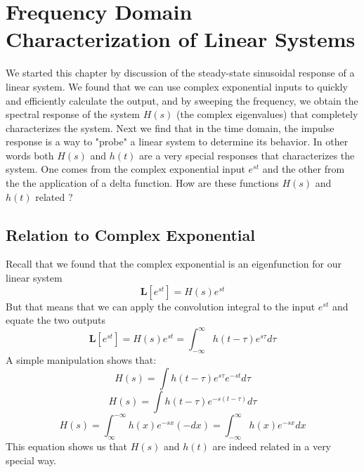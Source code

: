 \section{Frequency Domain Characterization of Linear Systems}
We started this chapter by discussion of the steady-state sinusoidal response of a linear system.  We found that we can use complex exponential inputs to quickly and efficiently calculate the output, and by sweeping the frequency, we obtain the spectral response of the system $H(s)$ (the complex eigenvalues) that completely characterizes the system.   Next we find that in the time domain, the impulse response is a way to "probe" a linear system to determine its behavior.  In other words both $H(s)$ and $h(t)$ are a very special responses that characterizes the system.  One comes from the complex exponential input $e^{st}$ and the other from the the application of a delta function.  How are these functions $H(s)$ and $h(t)$ related ? 
\subsection{Relation to Complex Exponential}
Recall that we found that the complex exponential is an eigenfunction for our linear system 
    \begin{equation}
        \mathbf{L} [ e^{st} ] = H(s) e^{st}
    \end{equation}
But that means that we can apply the convolution integral to the input $e^{st}$ and equate the two outputs
    \begin{equation}
        \mathbf{L} [ e^{st} ] = H(s) e^{st}  = \int_{-\infty}^{\infty} h(t-\tau) e^{s\tau} d\tau
    \end{equation}
A simple manipulation shows that:
    \begin{equation}
        H(s) = \int h(t-\tau) e^{s\tau} e^{-st} d\tau
    \end{equation}
    \begin{equation}
        H(s) = \int h(t-\tau) e^{-s(t- \tau)}  d\tau
    \end{equation}
    \begin{equation}
        H(s) = \int_{\infty}^{-\infty} h(x) e^{-sx} (-dx) = \int_{-\infty}^{\infty} h(x) e^{-sx} dx 
    \end{equation}
This equation shows us that $H(s)$ and $h(t)$ are indeed related in a very special way.
